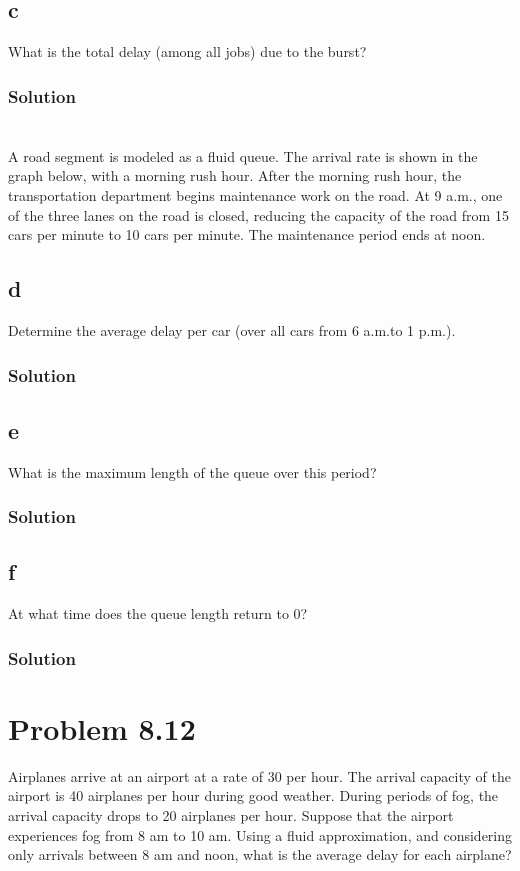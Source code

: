\documentclass{amsart}
\begin{document}
\subsection*{c}
What is the total delay (among all jobs) due to the burst?

\subsubsection*{Solution}

\section{} %
A road segment is modeled as a fluid queue. The arrival rate is shown in the graph below,
with a morning rush hour. After the morning rush hour, the transportation department
begins maintenance work on the road. At 9 a.m., one of the three lanes on the road is
closed, reducing the capacity of the road from 15 cars per minute to 10 cars per minute.
The maintenance period ends at noon.
\subsection*{d}
Determine the average delay per car (over all cars from 6 a.m.to 1 p.m.).
\subsubsection*{Solution}
\subsection*{e}
What is the maximum length of the queue over this period?
\subsubsection*{Solution}
\subsection*{f}
At what time does the queue length return to 0?
\subsubsection*{Solution}

\section{Problem 8.12} %
Airplanes arrive at an airport at a rate of 30 per hour. The arrival capacity
of the airport is 40 airplanes per hour during good weather. During periods
of fog, the arrival capacity drops to 20 airplanes per hour. Suppose that the
airport experiences fog from 8 am to 10 am. Using a fluid approximation,
and considering only arrivals between 8 am and noon, what is the average
delay for each airplane?
\end{document}
